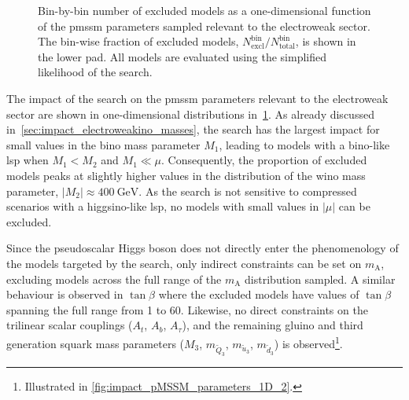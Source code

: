 \begin{figure}
\begin{subfigure}[b]{0.5\linewidth}
	\end{subfigure}\hfill
	\caption{Bin-by-bin number of excluded models as a one-dimensional function of the \gls{pmssm} parameters sampled relevant to the electroweak sector. The bin-wise fraction of excluded models, $N^\mathrm{bin}_\mathrm{excl} / N^\mathrm{bin}_\mathrm{total}$, is shown in the lower pad. All models are evaluated using the simplified likelihood of the \onelepton search.}
	\label{fig:impact_pMSSM_parameters_1D}
\end{figure}

The impact of the \onelepton search on the \gls{pmssm} parameters relevant to the electroweak sector are shown in one-dimensional distributions in~\cref{fig:impact_pMSSM_parameters_1D}. As already discussed in~\cref{sec:impact_electroweakino_masses}, the \onelepton search has the largest impact for small values in the bino mass parameter $M_1$, leading to models with a bino-like \gls{lsp} when $M_1 < M_2$ and $M_1 \ll \mu$.
Consequently, the proportion of excluded models peaks at slightly higher values in the distribution of the wino mass parameter, $\vert M_2\vert\approx\SI{400}{\GeV}$. As the search is not sensitive to compressed scenarios with a higgsino-like \gls{lsp}, no models with small values in $\vert\mu\vert$ can be excluded. 

Since the pseudoscalar Higgs boson does not directly enter the phenomenology of the models targeted by the \onelepton search, only indirect constraints can be set on $m_\mathrm{A}$, excluding models across the full range of the $m_\mathrm{A}$ distribution sampled.
A similar behaviour is observed in $\tan\beta$ where the excluded models have values of $\tan\beta$ spanning the full range from 1 to 60.
Likewise, no direct constraints on the trilinear scalar couplings ($A_t$, $A_b$, $A_\tau$), and the remaining gluino and third generation squark mass parameters ($M_3$, $m_{\tilde{Q}_3}$, $m_{\tilde{u}_3}$, $m_{\tilde{d}_3}$) is observed\footnote{Illustrated in \cref{fig:impact_pMSSM_parameters_1D_2}.}. 



